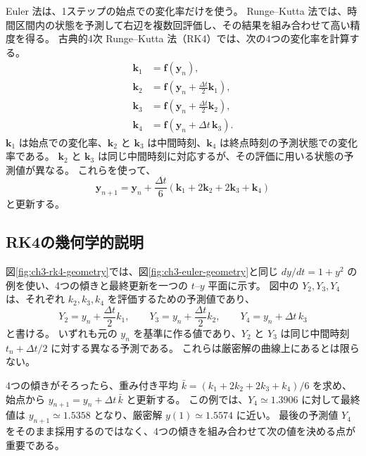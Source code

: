 Euler 法は、1ステップの始点での変化率だけを使う。
Runge--Kutta 法では、時間区間内の状態を予測して右辺を複数回評価し、その結果を組み合わせて高い精度を得る。
古典的4次 Runge--Kutta 法（RK4）では、次の4つの変化率を計算する。
\begin{align}
 \boldsymbol{k}_1&=\boldsymbol{f}(\boldsymbol{y}_n),\label{eq:ch3-rk-k1}\\
 \boldsymbol{k}_2&=\boldsymbol{f}\left(\boldsymbol{y}_n+\frac{\Delta t}{2}\boldsymbol{k}_1\right),\label{eq:ch3-rk-k2}\\
 \boldsymbol{k}_3&=\boldsymbol{f}\left(\boldsymbol{y}_n+\frac{\Delta t}{2}\boldsymbol{k}_2\right),\label{eq:ch3-rk-k3}\\
 \boldsymbol{k}_4&=\boldsymbol{f}\left(\boldsymbol{y}_n+\Delta t\,\boldsymbol{k}_3\right).\label{eq:ch3-rk-k4}
\end{align}
$\boldsymbol{k}_1$ は始点での変化率、$\boldsymbol{k}_2$ と $\boldsymbol{k}_3$ は中間時刻、$\boldsymbol{k}_4$ は終点時刻の予測状態での変化率である。
$\boldsymbol{k}_2$ と $\boldsymbol{k}_3$ は同じ中間時刻に対応するが、その評価に用いる状態の予測値が異なる。
これらを使って、
\begin{equation}
 \boxed{\boldsymbol{y}_{n+1}=\boldsymbol{y}_n+\frac{\Delta t}{6}
 \left(\boldsymbol{k}_1+2\boldsymbol{k}_2+2\boldsymbol{k}_3+\boldsymbol{k}_4\right)}
\label{eq:ch3-rk4}
\end{equation}
と更新する\cite{kouya2021}。

\subsection{RK4の幾何学的説明}
図\ref{fig:ch3-rk4-geometry}では、図\ref{fig:ch3-euler-geometry}と同じ $dy/dt=1+y^2$ の例を使い、4つの傾きと最終更新を一つの $t$--$y$ 平面に示す。
図中の $Y_2,Y_3,Y_4$ は、それぞれ $k_2,k_3,k_4$ を評価するための予測値であり、
\begin{equation*}
 Y_2=y_n+\frac{\Delta t}{2}k_1,\qquad
 Y_3=y_n+\frac{\Delta t}{2}k_2,\qquad
 Y_4=y_n+\Delta t\,k_3
\end{equation*}
と書ける。
いずれも元の $y_n$ を基準に作る値であり、$Y_2$ と $Y_3$ は同じ中間時刻 $t_n+\Delta t/2$ に対する異なる予測である。
これらは厳密解の曲線上にあるとは限らない。

4つの傾きがそろったら、重み付き平均 $\bar{k}=(k_1+2k_2+2k_3+k_4)/6$ を求め、始点から $y_{n+1}=y_n+\Delta t\,\bar{k}$ と更新する。
この例では、$Y_4\simeq1.3906$ に対して最終値は $y_{n+1}\simeq1.5358$ となり、厳密解 $y(1)\simeq1.5574$ に近い。
最後の予測値 $Y_4$ をそのまま採用するのではなく、4つの傾きを組み合わせて次の値を決める点が重要である。

